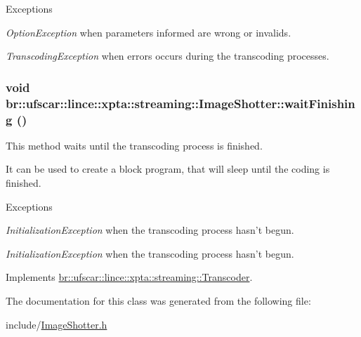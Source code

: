 \begin{DoxyExceptions}{Exceptions}
\item[{\em OptionException}]when parameters informed are wrong or invalids. \item[{\em TranscodingException}]when errors occurs during the transcoding processes. \end{DoxyExceptions}
\hypertarget{classbr_1_1ufscar_1_1lince_1_1xpta_1_1streaming_1_1ImageShotter_a68b16838853a0703f75ba80c5b31ee94}{
\subsubsection[{waitFinishing}]{\setlength{\rightskip}{0pt plus 5cm}void br::ufscar::lince::xpta::streaming::ImageShotter::waitFinishing ()}}
\label{classbr_1_1ufscar_1_1lince_1_1xpta_1_1streaming_1_1ImageShotter_a68b16838853a0703f75ba80c5b31ee94}


This method waits until the transcoding process is finished. 

It can be used to create a block program, that will sleep until the coding is finished. 
\begin{DoxyExceptions}{Exceptions}
\item[{\em InitializationException}]when the transcoding process hasn't begun. \item[{\em InitializationException}]when the transcoding process hasn't begun. \end{DoxyExceptions}


Implements \hyperlink{classbr_1_1ufscar_1_1lince_1_1xpta_1_1streaming_1_1Transcoder_ac060d2266b2b4b41b1f62eb0c6a48be3}{br::ufscar::lince::xpta::streaming::Transcoder}.



The documentation for this class was generated from the following file:\begin{DoxyCompactItemize}
\item 
include/\hyperlink{ImageShotter_8h}{ImageShotter.h}\end{DoxyCompactItemize}
